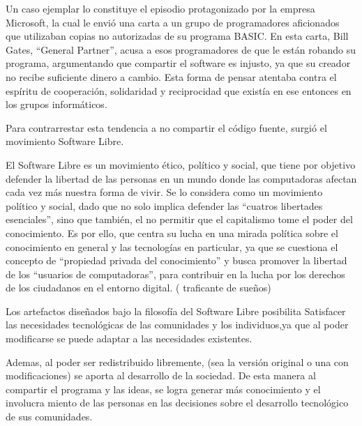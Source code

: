 	Un caso ejemplar lo constituye el episodio protagonizado por la empresa Microsoft, la cual le envió una carta a un grupo de programadores	aficionados que utilizaban copias no autorizadas de su programa BASIC. En esta carta, Bill Gates, “General Partner”, acusa a esos programadores de que le están robando su programa, argumentando que compartir el software es injusto, ya que su creador no recibe suficiente dinero a cambio. Esta forma de pensar atentaba contra el espíritu de cooperación, solidaridad y reciprocidad que existía en ese entonces en los grupos informáticos.\par
	
	Para contrarrestar esta tendencia a no compartir el código fuente, surgió
	el movimiento Software Libre.\par
	
	
	El Software Libre es un movimiento ético, político y social, que tiene por objetivo defender la libertad de las personas en un mundo donde las computadoras afectan cada vez más nuestra forma de vivir. Se lo considera como un movimiento político y social, dado que no solo implica defender las “cuatros libertades esenciales”, sino que también, el no permitir que el capitalismo tome el poder del conocimiento. Es por ello, que centra su lucha en una mirada política sobre el conocimiento en general y las tecnologías en particular, ya que se cuestiona el concepto de “propiedad privada del conocimiento” y busca promover la libertad de los “usuarios de computadoras”, para contribuir en la lucha por los derechos de los ciudadanos en el entorno digital. ( traficante de sueños)\par
	
	Los artefactos diseñados bajo la filosofía del Software Libre posibilita Satisfacer las necesidades tecnológicas de las comunidades y los individuos,ya que al poder modificarse se puede adaptar a las necesidades existentes.\par
	
	Ademas, al poder ser redistribuido libremente, (sea la versión original o una con modificaciones) se aporta al desarrollo de la sociedad. De esta manera al compartir el programa y las ideas, se logra generar más conocimiento y el involucra miento de las personas en las decisiones sobre el desarrollo tecnológico de sus comunidades.\par
	\vspace{1cm}
